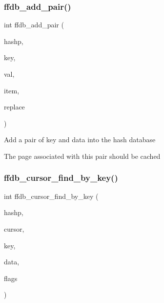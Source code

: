 \subsubsection{\texorpdfstring{ffdb\_add\_pair()}{ffdb\_add\_pair()}}
{\footnotesize\ttfamily int ffdb\+\_\+add\+\_\+pair (\begin{DoxyParamCaption}\item[{\mbox{\hyperlink{adat-devel_2other__libs_2filedb_2filehash_2ffdb__hash_8h_ae592010ed2bedc975d3cc0b7d074b9d1}{ffdb\+\_\+htab\+\_\+t}} $\ast$}]{hashp,  }\item[{\mbox{\hyperlink{adat-devel_2other__libs_2filedb_2filehash_2ffdb__db_8h_aa2e0984399491df0fdd20898ca8758f9}{F\+F\+D\+B\+\_\+\+D\+BT}} $\ast$}]{key,  }\item[{const \mbox{\hyperlink{adat-devel_2other__libs_2filedb_2filehash_2ffdb__db_8h_aa2e0984399491df0fdd20898ca8758f9}{F\+F\+D\+B\+\_\+\+D\+BT}} $\ast$}]{val,  }\item[{\mbox{\hyperlink{adat-devel_2other__libs_2filedb_2filehash_2ffdb__hash_8h_aa1cea5ccbd6513ed152988f7a71a936d}{ffdb\+\_\+hent\+\_\+t}} $\ast$}]{item,  }\item[{int}]{replace }\end{DoxyParamCaption})}

Add a pair of key and data into the hash database

The page associated with this pair should be cached \mbox{\label{adat-devel_2other__libs_2filedb_2filehash_2ffdb__page_8c_aea5399416023115e9fbfa5a593963786}} 
\subsubsection{\texorpdfstring{ffdb\_cursor\_find\_by\_key()}{ffdb\_cursor\_find\_by\_key()}}
{\footnotesize\ttfamily int ffdb\+\_\+cursor\+\_\+find\+\_\+by\+\_\+key (\begin{DoxyParamCaption}\item[{\mbox{\hyperlink{adat-devel_2other__libs_2filedb_2filehash_2ffdb__hash_8h_ae592010ed2bedc975d3cc0b7d074b9d1}{ffdb\+\_\+htab\+\_\+t}} $\ast$}]{hashp,  }\item[{\mbox{\hyperlink{adat-devel_2other__libs_2filedb_2filehash_2ffdb__hash_8h_a103d84beefb6d7306cb252c4d7f25479}{ffdb\+\_\+crs\+\_\+t}} $\ast$}]{cursor,  }\item[{\mbox{\hyperlink{adat-devel_2other__libs_2filedb_2filehash_2ffdb__db_8h_aa2e0984399491df0fdd20898ca8758f9}{F\+F\+D\+B\+\_\+\+D\+BT}} $\ast$}]{key,  }\item[{\mbox{\hyperlink{adat-devel_2other__libs_2filedb_2filehash_2ffdb__db_8h_aa2e0984399491df0fdd20898ca8758f9}{F\+F\+D\+B\+\_\+\+D\+BT}} $\ast$}]{data,  }\item[{unsigned int}]{flags }\end{DoxyParamCaption})}

